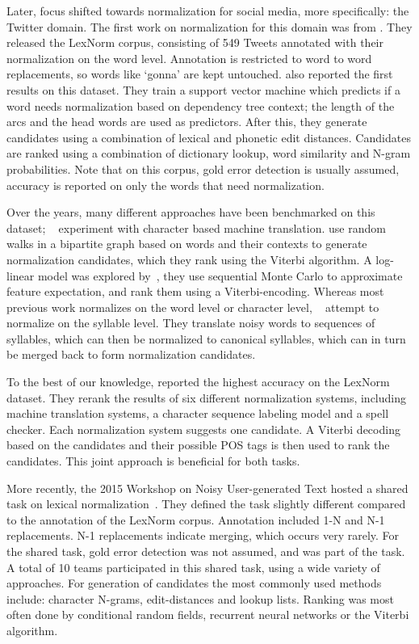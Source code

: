 \documentclass[a4paper,10pt,twoside]{article}
\begin{document}
Later, focus shifted towards normalization for social media, more specifically:
the Twitter domain. The first work on normalization for this domain was from
. They released the LexNorm corpus,
consisting of 549 Tweets annotated with their normalization on the word level.
Annotation is restricted to word to word replacements, so words like `gonna'
are kept untouched.  also reported the
first results on this dataset.  They train a support vector machine which
predicts if a word needs normalization based on dependency tree context; the
length of the arcs and the head words are used as predictors. After this, they
generate candidates using a combination of lexical and phonetic edit distances.
Candidates are ranked using a combination of dictionary lookup, word similarity
and N-gram probabilities. Note that on this corpus, gold error detection is
usually assumed, accuracy is reported on only the words that need
normalization.

Over the years, many different approaches have been benchmarked on this
dataset; ~ experiment with character based machine
translation.   use random walks in a
bipartite graph based on words and their contexts to generate normalization
candidates, which they rank using the Viterbi algorithm. A log-linear model was
explored by~, they use sequential Monte
Carlo to approximate feature expectation, and rank them using a
Viterbi-encoding. Whereas most previous work normalizes on the word level or
character level, ~ attempt to normalize
on the syllable level. They translate noisy words to sequences of syllables,
which can then be normalized to canonical syllables, which can in turn be
merged back to form normalization candidates.


To the best of our knowledge,  reported the highest
accuracy on the LexNorm dataset. They rerank the results of six different
normalization systems, including machine translation systems, a character
sequence labeling model and a spell checker. Each normalization system suggests
one candidate.  A Viterbi decoding based on the candidates and their possible
POS tags is then used to rank the candidates. This joint approach is beneficial
for both tasks.

More recently, the 2015 Workshop on Noisy User-generated Text hosted a shared
task on lexical normalization~\cite{baldwin-EtAl:2015:WNUT}. They defined the
task slightly different compared to the annotation of the LexNorm corpus.
Annotation included 1-N and N-1 replacements. N-1 replacements indicate
merging, which occurs very rarely. For the shared task, gold error detection
was not assumed, and was part of the task. A total of 10 teams participated in
this shared task, using a wide variety of approaches. For generation of
candidates the most commonly used methods include: character N-grams,
edit-distances and lookup lists. Ranking was most often done by conditional
random fields, recurrent neural networks or the Viterbi algorithm.
\end{document}
